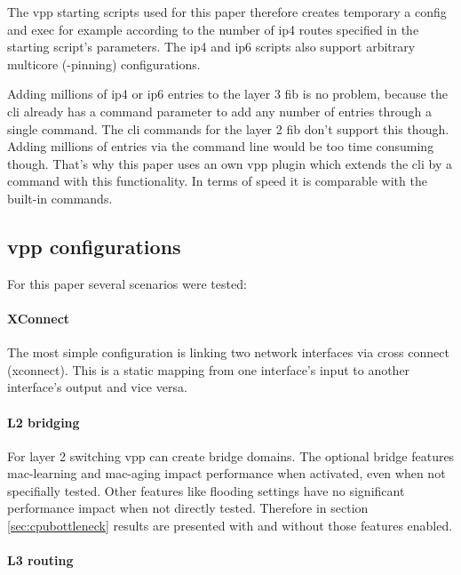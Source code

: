 The vpp starting scripts used for this paper therefore creates
temporary a \Ac{config} and \Ac{exec} for example according to the
number of \Ac{ip4} routes specified in the starting script's
parameters. The \Ac{ip4} and \Ac{ip6} scripts also support arbitrary
multicore (-pinning) configurations.


Adding millions of \Ac{ip4} or \Ac{ip6} entries to the layer 3
\Ac{fib} is no problem, because the \Ac{cli} already has a command
parameter to add any number of entries through a single command. The
\Ac{cli} commands for the layer 2 \Ac{fib} don't support this though.
Adding millions of entries via the command line would be too time
consuming though. That's why this paper uses an own \Ac{vpp} plugin
which extends the \Ac{cli} by a command with this functionality. In
terms of speed it is comparable with the built-in commands.


\subsection{\Ac{vpp} configurations}

For this paper several scenarios were tested: 

\paragraph{XConnect} 

The most simple configuration is linking two network interfaces via
cross connect (xconnect). This is a static mapping from one
interface's input to another interface's output and vice versa.

\paragraph{L2 bridging}

For layer 2 switching \Ac{vpp} can create bridge domains. The optional
bridge features mac-learning and mac-aging impact performance when
activated, even when not specifially tested. Other features like
flooding settings have no significant performance impact when not
directly tested. Therefore in section \ref{sec:cpubottleneck} results
are presented with and without those features enabled.

\paragraph{L3 routing}

